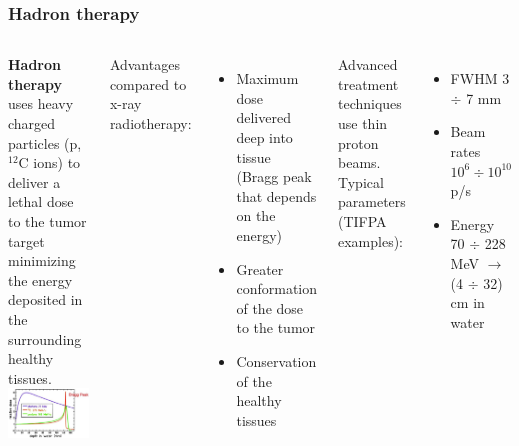 \documentclass[aspectratio=169]{beamer}
\begin{document}
	\begin{frame}
	\frametitle{Hadron therapy}
		\begin{columns}
		\begin{center}
			\textbf{Hadron therapy} uses heavy charged particles (p, ${}^{12}$C ions) to deliver a lethal dose to the tumor target minimizing the energy deposited in the surrounding healthy tissues.
			\includegraphics[width=0.95 \textwidth]{IMG/Bragg_Peak.PNG}
		\end{center}
		
			{\color{blue} Advantages compared to x-ray radiotherapy:}
			\begin{itemize}
				\item Maximum dose delivered deep into tissue (Bragg peak that depends on the energy)
				\item Greater conformation of the dose to the tumor
				\item Conservation of the healthy tissues 
			\end{itemize}
		\vspace{1 cm}
			{\color{blue} Advanced treatment techniques use thin proton beams. \\ Typical parameters (TIFPA examples):}
			\begin{itemize}
				\item FWHM 3 $\div$ 7 mm
				\item Beam rates $10^6\div10^{10}$ p/s
				\item Energy 70 $\div$ 228 MeV $\rightarrow$ (4 $\div$ 32) cm in water
			\end{itemize}
		
		\end{columns}
	\end{frame}
\end{document}

